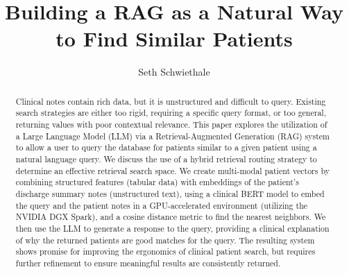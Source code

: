 \documentclass[acmtog]{acmart}
\begin{document}
\title{Building a RAG as a Natural Way to Find Similar Patients}

\author{Seth Schwiethale}

\begin{abstract}
  Clinical notes contain rich data, but it is unstructured and difficult to query. Existing search strategies are either too rigid, requiring a specific query format, or too general, returning values with poor contextual relevance. This paper explores the utilization of a Large Language Model (LLM) via a Retrieval-Augmented Generation (RAG) system to allow a user to query the database for patients similar to a given patient using a natural language query.  We discuss the use of a hybrid retrieval routing strategy to determine an effective retrieval search space. We create multi-modal patient vectors by combining structured features (tabular data) with embeddings of the patient's discharge summary notes (unstructured text), using a clinical BERT model to embed the query and the patient notes in a GPU-accelerated environment (utilizing the NVIDIA DGX Spark), and a cosine distance metric to find the nearest neighbors. We then use the LLM to generate a response to the query, providing a clinical explanation of why the returned patients are good matches for the query. The resulting system shows promise for improving the ergonomics of clinical patient search, but requires further refinement to ensure meaningful results are consistently returned.
\end{abstract}




\maketitle
\end{document}
